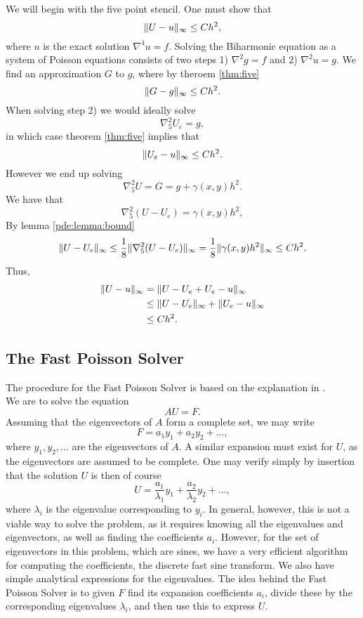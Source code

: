We will begin with the five point stencil.
One must show that
$$
\lVert U - u \rVert_\infty \leq Ch^2,
$$
where $u$ is the exact solution $\nabla^4 u = f$.
Solving the Biharmonic equation as a system of Poisson equations consists of two steps 1) $\nabla^2 g = f$ and 2) $\nabla^2 u = g$.
We find an approximation $G$ to $g$, where by theroem \ref{thm:five}
$$
\lVert G - g \rVert_\infty \leq C h^2.
$$
When solving step 2) we would ideally solve
$$
\nabla_5^2 U_e = g,
$$
in which case theorem \ref{thm:five} implies that
$$
\lVert U_e - u \rVert_\infty \leq C h^2.
$$
However we end up solving
$$
\nabla_5^2 U = G = g + \gamma(x, y) h^2.
$$
We have that
\begin{equation}
  \nabla_5^2 (U - U_e) = \gamma(x, y) h^2,
\end{equation}
By lemma \ref{pde:lemma:bound}
$$
\lVert U - U_e \rVert_\infty \leq \frac18 \lVert \nabla_5^2 (U - U_e) \rVert_\infty = \frac18 \lVert \gamma(x, y) h^2 \rVert_\infty \leq C h^2.
$$
Thus,
\begin{align*}
  \lVert U - u \rVert_\infty &= \lVert U - U_e + U_e - u \rVert_\infty\\
  &\leq \lVert U - U_e \rVert_\infty + \lVert U_e - u \rVert_\infty\\
  &\leq C h^2.
\end{align*}


\subsection{The Fast Poisson Solver}
The procedure for the Fast Poisson Solver is based on the explanation in \cite{Strang_2012}.\\

We are to solve the equation
$$
A U = F.
$$
Assuming that the eigenvectors of $A$ form a complete set, we may write
$$
F = a_1 y_1 + a_2 y_2 + ...,
$$
where $y_1, y_2, \dots$ are the eigenvectors of $A$.
A similar expansion must exist for $U$, as the eigenvectors are assumed to be complete.
One may verify simply by insertion that the solution $U$ is then of course
$$
U =
\frac{a_1}{\lambda_1} y_1
+ \frac{a_2}{\lambda_2} y_2
+ \dots,
$$
where $\lambda_i$ is the eigenvalue corresponding to $y_i$.
In general, however, this is not a viable way to solve the problem, as it requires knowing all the eigenvalues and eigenvectors, as well as finding the coefficients $a_i$.
However, for the set of eigenvectors in this problem, which are sines, we have a very efficient algorithm for computing the coefficients, the discrete fast sine transform.
We also have simple analytical expressions for the eigenvalues.
The idea behind the Fast Poisson Solver is to given $F$ find its expansion coefficients $a_i$, divide these by the corresponding eigenvalues $\lambda_i$, and then use this to express $U$.

